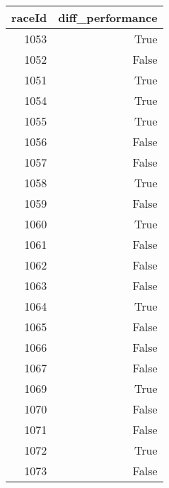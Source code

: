 \begin{tabular}{rr}
\toprule
raceId & diff_performance \\
\midrule
1053 & True \\
1052 & False \\
1051 & True \\
1054 & True \\
1055 & True \\
1056 & False \\
1057 & False \\
1058 & True \\
1059 & False \\
1060 & True \\
1061 & False \\
1062 & False \\
1063 & False \\
1064 & True \\
1065 & False \\
1066 & False \\
1067 & False \\
1069 & True \\
1070 & False \\
1071 & False \\
1072 & True \\
1073 & False \\
\bottomrule
\end{tabular}
